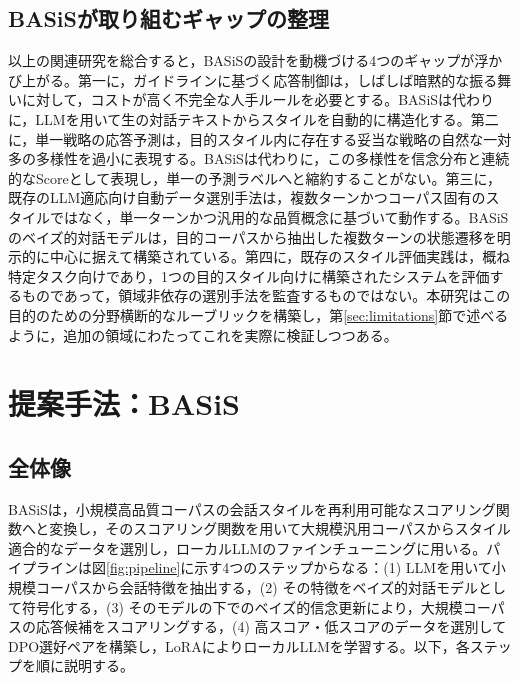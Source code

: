 \documentclass[manuscript,review,anonymous]{acmart}
\begin{document}
\subsection{BASiSが取り組むギャップの整理}
以上の関連研究を総合すると，BASiSの設計を動機づける4つのギャップが浮かび上がる。第一に，ガイドラインに基づく応答制御は，しばしば暗黙的な振る舞いに対して，コストが高く不完全な人手ルールを必要とする\cite{wen2025guidedtod}。BASiSは代わりに，LLMを用いて生の対話テキストからスタイルを自動的に構造化する。第二に，単一戦略の応答予測は，目的スタイル内に存在する妥当な戦略の自然な一対多の多様性を過小に表現する\cite{wan2025emodynamix}。BASiSは代わりに，この多様性を信念分布と連続的なScoreとして表現し，単一の予測ラベルへと縮約することがない。第三に，既存のLLM適応向け自動データ選別手法は，複数ターンかつコーパス固有のスタイルではなく，単一ターンかつ汎用的な品質概念に基づいて動作する\cite{chen2023alpagasus,zhang2025datasurvey}。BASiSのベイズ的対話モデルは，目的コーパスから抽出した複数ターンの状態遷移を明示的に中心に据えて構築されている。第四に，既存のスタイル評価実践は，概ね特定タスク向けであり，1つの目的スタイル向けに構築されたシステムを評価するものであって，領域非依存の選別手法を監査するものではない\cite{mir2019styletransfer,liu2021esconv,zhang2018persona,deng2023mixedinitiative}。本研究はこの目的のための分野横断的なルーブリックを構築し，第\ref{sec:limitations}節で述べるように，追加の領域にわたってこれを実際に検証しつつある。


\section{提案手法：BASiS}
\label{sec:method}

\subsection{全体像}
BASiSは，小規模高品質コーパスの会話スタイルを再利用可能なスコアリング関数へと変換し，そのスコアリング関数を用いて大規模汎用コーパスからスタイル適合的なデータを選別し，ローカルLLMのファインチューニングに用いる。パイプラインは図\ref{fig:pipeline}に示す4つのステップからなる：(1) LLMを用いて小規模コーパスから会話特徴を抽出する，(2) その特徴をベイズ的対話モデルとして符号化する，(3) そのモデルの下でのベイズ的信念更新により，大規模コーパスの応答候補をスコアリングする，(4) 高スコア・低スコアのデータを選別してDPO選好ペアを構築し，LoRAによりローカルLLMを学習する。以下，各ステップを順に説明する。
\end{document}
